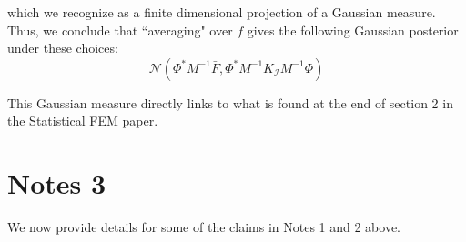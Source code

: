 \documentclass{article}
\theoremstyle{definition}
\theoremstyle{remark}
\begin{document}
which we recognize as a finite dimensional projection of a Gaussian measure. Thus, we conclude that ``averaging" over $f$ gives the following Gaussian posterior under these choices:
\begin{equation}
    \label{average_posterior_FEM_prior}
    \mathcal{N}(\Phi^{*}M^{-1}\bar{F},\Phi^{*}M^{-1}K_{\mathcal{I}}M^{-1}\Phi)
\end{equation}

This Gaussian measure directly links to what is found at the end of section 2 in the Statistical FEM paper.

\section{Notes 3}

We now provide details for some of the claims in Notes 1 and 2 above. \\
\end{document}
